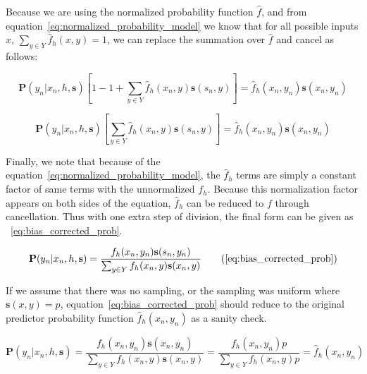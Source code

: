 \documentclass[twoside]{article}
\begin{document}
\begin{appendices}
Because we are using the normalized probability function \(\hat{f}\), and from equation~\eqref{eq:normalized_probability_model} we know that for all possible inputs \(x\), \(\sum_{y \in Y} \hat{f}_h(x, y) = 1\), we can replace the summation over \(\hat{f}\) and cancel as follows:

\[\mathbf{P}(y_n|x_n,h,\mathbf{s})\left [ 1 - 1+\sum_{y \in Y}\hat{f}_h(x_n,y)\mathbf{s}(s_n,y) \right ]=\hat{f}_h(x_n,y_n)\mathbf{s}(x_n,y_n) \]

\[\mathbf{P}(y_n|x_n,h,\mathbf{s})\left [\sum_{y \in Y}\hat{f}_h(x_n,y)\mathbf{s}(s_n,y) \right ]=\hat{f}_h(x_n,y_n)\mathbf{s}(x_n,y_n) \]

Finally, we note that because of the equation~\eqref{eq:normalized_probability_model}, the \(\hat{f}_h\) terms are simply a constant factor of same terms with the unnormalized \(f_h\). Because this normalization factor appears on both sides of the equation, \(\hat{f}_h\) can be reduced to \(f\) through cancellation. Thus with one extra step of division, the final form can be given as ~\eqref{eq:bias_corrected_prob}.

\begin{equation}
\mathbf{P}(y_n|x_n,h,\mathbf{s})=\dfrac{f_h(x_n,y_n)\mathbf{s}(s_n,y_n)}{\sum_{y \in Y}f_h(x_n,y)\mathbf{s}(x_n,y)}
\tag{\ref{eq:bias_corrected_prob}}
\end{equation}

If we assume that there was no sampling, or the sampling was uniform where \(\mathbf{s}(x,y)=p\), equation~\eqref{eq:bias_corrected_prob} should reduce to the original predictor probability function \(\hat{f}_h(x_n,y_n)\) as a sanity check.

\[\mathbf{P}(y_n|x_n,h,\mathbf{s})=\frac{f_h(x_n,y_n)\mathbf{s}(x_n,y_n)}{\sum_{y \in Y}f_h(x_n,y)\mathbf{s}(x_n,y)}=\frac{f_h(x_n,y_n)p}{\sum_{y \in Y}f_h(x_n,y)p} =\hat{f}_h(x_n,y_n)\]

\end{appendices}

\end{document}
